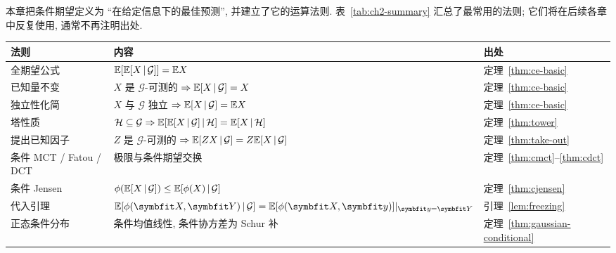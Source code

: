 本章把条件期望定义为 ``在给定信息下的最佳预测'', 并建立了它的运算法则. 表~\ref{tab:ch2-summary} 汇总了最常用的法则; 它们将在后续各章中反复使用, 通常不再注明出处.

\begin{center}
\label{tab:ch2-summary}
\renewcommand{\arraystretch}{1.5}
\begin{tabular}{>{\raggedright\arraybackslash}p{} >{\raggedright\arraybackslash}p{} >{\raggedright\arraybackslash}p{}}
\toprule
法则 & 内容 & 出处 \\
\midrule
全期望公式 & $\mathbb{E}[\mathbb{E}[X\,|\,\mathcal{G}]]=\mathbb{E} X$ & 定理~\ref{thm:ce-basic} \\
已知量不变 & $X$ 是 $\mathcal{G}$-可测的 $\Rightarrow\mathbb{E}[X\,|\,\mathcal{G}]=X$ & 定理~\ref{thm:ce-basic} \\
独立性化简 & $X$ 与 $\mathcal{G}$ 独立 $\Rightarrow\mathbb{E}[X\,|\,\mathcal{G}]=\mathbb{E} X$ & 定理~\ref{thm:ce-basic} \\
塔性质 & $\mathcal{H}\subseteq\mathcal{G}\Rightarrow\mathbb{E}[\mathbb{E}[X\,|\,\mathcal{G}]\,|\,\mathcal{H}]=\mathbb{E}[X\,|\,\mathcal{H}]$ & 定理~\ref{thm:tower} \\
提出已知因子 & $Z$ 是 $\mathcal{G}$-可测的 $\Rightarrow\mathbb{E}[ZX\,|\,\mathcal{G}]=Z\mathbb{E}[X\,|\,\mathcal{G}]$ & 定理~\ref{thm:take-out} \\
条件 MCT / Fatou / DCT & 极限与条件期望交换 & 定理~\ref{thm:cmct}--\ref{thm:cdct} \\
条件 Jensen & $\phi(\mathbb{E}[X\,|\,\mathcal{G}])\le\mathbb{E}[\phi(X)\,|\,\mathcal{G}]$ & 定理~\ref{thm:cjensen} \\
代入引理 & $\E[\phi(\rvec{X},\rvec{Y})\,|\,\mathcal{G}]=\E[\phi(\rvec{X},\rvec{y})]|_{\rvec{y}=\rvec{Y}}$ & 引理~\ref{lem:freezing} \\
正态条件分布 & 条件均值线性, 条件协方差为 Schur 补 & 定理~\ref{thm:gaussian-conditional} \\
\bottomrule
\end{tabular}
\end{center}
